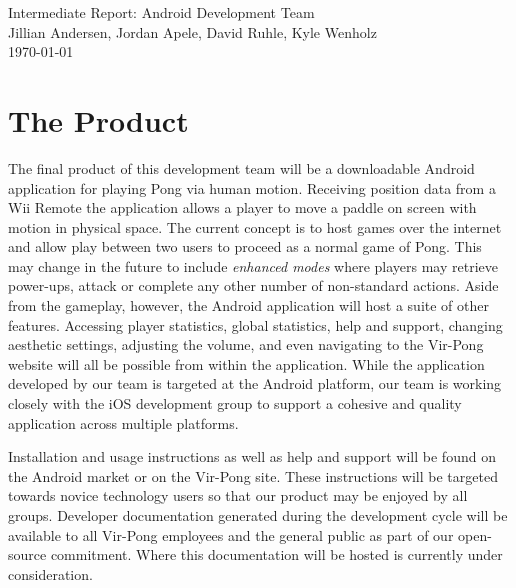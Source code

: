 \documentclass[12pt]{article}
\begin{document}
 \begin{titlepage}
    \vspace*{\fill}
    \begin{center}
      {\Huge Intermediate Report: Android Development Team}\\[0.5cm]
      {\Large Jillian Andersen, Jordan Apele, David Ruhle, Kyle Wenholz}\\[0.4cm]
      \today
    \end{center}
    \vspace*{\fill}
  \end{titlepage}
  
\tableofcontents
\newpage


\section{The Product}
The final product of this development team will be a downloadable Android application for playing Pong via human motion.  Receiving position data from a Wii Remote the application allows a player to move a paddle on screen with motion in physical space.  The current concept is to host games over the internet and allow play between two users to proceed as a normal game of Pong.  This may change in the future to include \textit{enhanced modes} where players may retrieve power-ups, attack or complete any other number of non-standard actions.  Aside from the gameplay, however, the Android application will host a suite of other features.  Accessing player statistics, global statistics, help and support, changing aesthetic settings, adjusting the volume, and even navigating to the Vir-Pong website will all be possible from within the application.  While the application developed by our team is targeted at the Android platform, our team is working closely with the iOS development group to support a cohesive and quality application across multiple platforms.  

Installation and usage instructions as well as help and support will be found on the Android market or on the Vir-Pong site.  These instructions will be targeted towards novice technology users so that our product may be enjoyed by all groups.  Developer documentation generated during the development cycle will be available to all Vir-Pong employees and the general public as part of our open-source commitment.  Where this documentation will be hosted is currently under consideration.  
\end{document}
